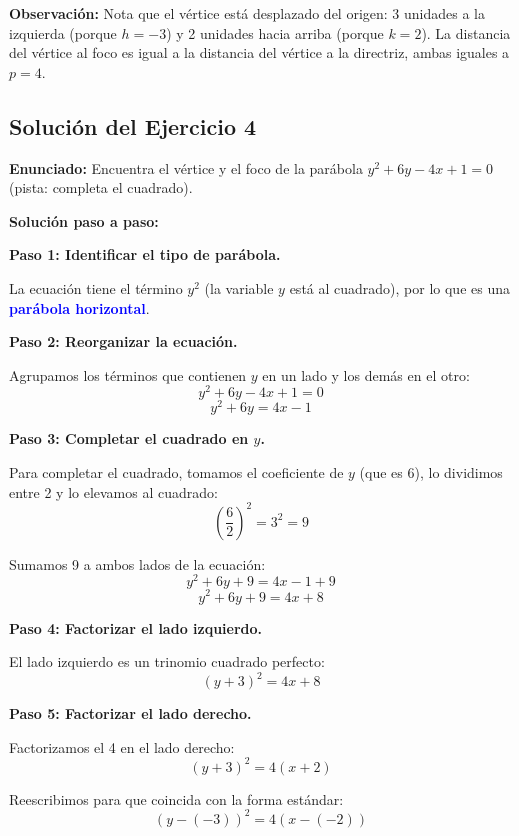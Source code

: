 \documentclass[12pt,a4paper]{article}
\begin{document}
	\bigskip

	\textbf{Observación:} Nota que el vértice está desplazado del origen: 3 unidades a la izquierda (porque \(h=-3\)) y 2 unidades hacia arriba (porque \(k=2\)). La distancia del vértice al foco es igual a la distancia del vértice a la directriz, ambas iguales a \(p=4\).
	
	\vspace{3mm}


	\subsection*{Solución del Ejercicio 4}

	\textbf{Enunciado:} Encuentra el vértice y el foco de la parábola \(y^2+6y-4x+1=0\) (pista: completa el cuadrado).

	\bigskip

	\textbf{Solución paso a paso:}

	\bigskip

	\textbf{Paso 1: Identificar el tipo de parábola.}

	La ecuación tiene el término \(y^2\) (la variable \(y\) está al cuadrado), por lo que es una \textcolor{blue}{\textbf{parábola horizontal}}.

	\bigskip

	\textbf{Paso 2: Reorganizar la ecuación.}

	Agrupamos los términos que contienen \(y\) en un lado y los demás en el otro:
	\[
	y^2+6y-4x+1=0
	\]
	\[
	y^2+6y=4x-1
	\]

	\textbf{Paso 3: Completar el cuadrado en \(y\).}

	Para completar el cuadrado, tomamos el coeficiente de \(y\) (que es 6), lo dividimos entre 2 y lo elevamos al cuadrado:
	\[
	\left(\frac{6}{2}\right)^2=3^2=9
	\]

	Sumamos 9 a ambos lados de la ecuación:
	\[
	y^2+6y+9=4x-1+9
	\]
	\[
	y^2+6y+9=4x+8
	\]

	\textbf{Paso 4: Factorizar el lado izquierdo.}

	El lado izquierdo es un trinomio cuadrado perfecto:
	\[
	(y+3)^2=4x+8
	\]

	\textbf{Paso 5: Factorizar el lado derecho.}

	Factorizamos el 4 en el lado derecho:
	\[
	(y+3)^2=4(x+2)
	\]

	Reescribimos para que coincida con la forma estándar:
	\[
	(y-(-3))^2=4(x-(-2))
	\]
\end{document}
